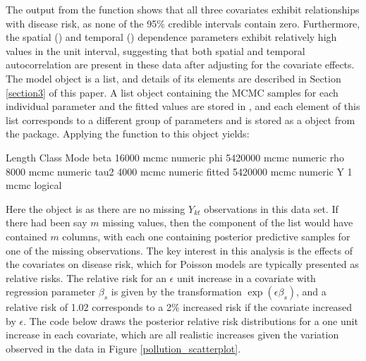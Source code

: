 \documentclass[article, nojss]{jss}
\begin{document}
The output from the  function shows that all three covariates exhibit relationships with disease risk, as none of the 95\% credible intervals contain zero. Furthermore, the spatial () and temporal () dependence parameters exhibit relatively high values in the unit interval, suggesting that both spatial and temporal autocorrelation are present in these data after adjusting for the covariate effects. The model object  is a list, and details of its elements are described in Section \ref{section3} of this paper. A list object containing the MCMC samples for each individual parameter and the fitted values are stored in , and each element of this list corresponds to a different group of parameters and is stored as a   object from the  package.  Applying the  function to this object yields:







\begin{CodeOutput}
       Length  Class Mode   
beta     16000 mcmc  numeric
phi    5420000 mcmc  numeric
rho       8000 mcmc  numeric
tau2      4000 mcmc  numeric
fitted 5420000 mcmc  numeric
Y            1 mcmc  logical
\end{CodeOutput}



Here the  object is  as there are no missing $Y_{kt}$ observations in this data set. If there had been say $m$ missing values, then the  component of the list would have contained $m$ columns, with each one containing posterior predictive samples for one of the missing observations. The key interest in this analysis is the effects of the covariates on disease risk, which for Poisson models are typically presented as relative risks. The relative risk for an $\epsilon$ unit increase in a covariate with regression parameter $\beta_s$ is given by the transformation $\exp(\epsilon\beta_s)$, and a relative risk of 1.02 corresponds to a 2\% increased risk if the covariate increased by $\epsilon$. The code below draws the posterior relative risk distributions for a one unit increase in each covariate, which are all realistic increases given the variation observed in the data in Figure \ref{pollution_scatterplot}.
\end{document}
